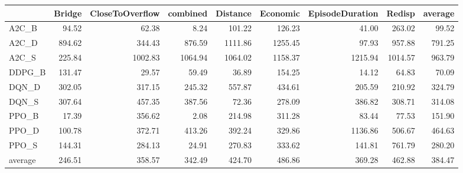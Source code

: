 \begin{tabular}{lrrrrrrrr}
\toprule
{} &  Bridge &  CloseToOverflow &  combined &  Distance &  Economic &  EpisodeDuration &   Redisp &  average \\
\midrule
A2C\_B   &   94.52 &            62.38 &      8.24 &    101.22 &    126.23 &            41.00 &   263.02 &    99.52 \\
A2C\_D   &  894.62 &           344.43 &    876.59 &   1111.86 &   1255.45 &            97.93 &   957.88 &   791.25 \\
A2C\_S   &  225.84 &          1002.83 &   1064.94 &   1064.02 &   1158.37 &          1215.94 &  1014.57 &   963.79 \\
DDPG\_B  &  131.47 &            29.57 &     59.49 &     36.89 &    154.25 &            14.12 &    64.83 &    70.09 \\
DQN\_D   &  302.05 &           317.15 &    245.32 &    557.87 &    434.61 &           205.59 &   210.92 &   324.79 \\
DQN\_S   &  307.64 &           457.35 &    387.56 &     72.36 &    278.09 &           386.82 &   308.71 &   314.08 \\
PPO\_B   &   17.39 &           356.62 &      2.08 &    214.98 &    311.28 &            83.44 &    77.53 &   151.90 \\
PPO\_D   &  100.78 &           372.71 &    413.26 &    392.24 &    329.86 &          1136.86 &   506.67 &   464.63 \\
PPO\_S   &  144.31 &           284.13 &     24.91 &    270.83 &    333.62 &           141.81 &   761.79 &   280.20 \\
average &  246.51 &           358.57 &    342.49 &    424.70 &    486.86 &           369.28 &   462.88 &   384.47 \\
\bottomrule
\end{tabular}
